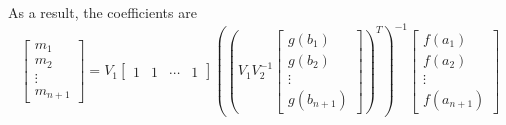 \documentclass[11pt]{article}
\begin{document}
\begin{enumerate}
			 As a result, the coefficients are
			 \[
			 \begin{bmatrix}
			 	m_1\\
			 	m_2\\
			 	\vdots\\
			 	m_{n + 1}
			 \end{bmatrix} = V_1\begin{bmatrix}
			 		1 & 1 & \cdots & 1
			 	\end{bmatrix}
			 \left(\left(V_1V_2^{-1}\begin{bmatrix}
			 	g(b_1)\\
			 	g(b_2)\\
			 	\vdots\\
			 	g(b_{n + 1})
			 \end{bmatrix}\right)^T\right)^{-1}\begin{bmatrix}
			 	f(a_1)\\
			 	f(a_2)\\
			 	\vdots\\
			 	f(a_{n + 1})
			 \end{bmatrix}
			 \]
	\end{enumerate}
\end{document}
